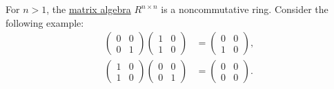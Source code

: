 \begin{example}\label{ex:matrix_multiplication_is_noncommutative}
  For \( n > 1 \), the \hyperref[thm:matrix_algebra]{matrix algebra} \( R^{n \times n} \) is a noncommutative ring. Consider the following example:
  \begin{align*}
    \begin{pmatrix}
      0 & 0 \\
      0 & 1
    \end{pmatrix}
    \begin{pmatrix}
      1 & 0 \\
      1 & 0
    \end{pmatrix}
    &=
    \begin{pmatrix}
      0 & 0 \\
      1 & 0
    \end{pmatrix},
    \\
    \begin{pmatrix}
      1 & 0 \\
      1 & 0
    \end{pmatrix}
    \begin{pmatrix}
      0 & 0 \\
      0 & 1
    \end{pmatrix}
    &=
    \begin{pmatrix}
      0 & 0 \\
      0 & 0
    \end{pmatrix}.
  \end{align*}
\end{example}

